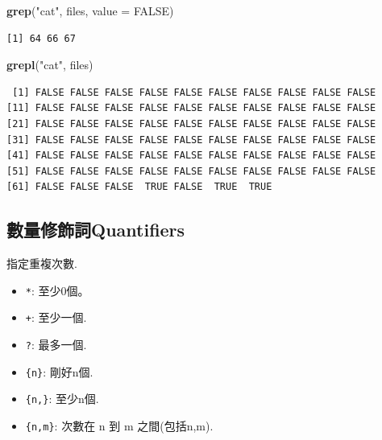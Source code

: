\documentclass[]{book}
\newenvironment{Shaded}{\begin{snugshade}}{\end{snugshade}}
\newcommand{\DataTypeTok}[1]{\textcolor[rgb]{0.13,0.29,0.53}{#1}}
\newcommand{\KeywordTok}[1]{\textcolor[rgb]{0.13,0.29,0.53}{\textbf{#1}}}
\newcommand{\NormalTok}[1]{#1}
\newcommand{\OtherTok}[1]{\textcolor[rgb]{0.56,0.35,0.01}{#1}}
\newcommand{\StringTok}[1]{\textcolor[rgb]{0.31,0.60,0.02}{#1}}
\providecommand{\tightlist}{%
  \setlength{\itemsep}{0pt}\setlength{\parskip}{0pt}}
\theoremstyle{definition}
\theoremstyle{definition}
\theoremstyle{definition}
\theoremstyle{remark}
\begin{document}
\begin{Shaded}
\begin{Highlighting}[]
\KeywordTok{grep}\NormalTok{(}\StringTok{"cat"}\NormalTok{, files, }\DataTypeTok{value =} \OtherTok{FALSE}\NormalTok{)}
\end{Highlighting}
\end{Shaded}

\begin{verbatim}
[1] 64 66 67
\end{verbatim}

\begin{Shaded}
\begin{Highlighting}[]
\KeywordTok{grepl}\NormalTok{(}\StringTok{"cat"}\NormalTok{, files)}
\end{Highlighting}
\end{Shaded}

\begin{verbatim}
 [1] FALSE FALSE FALSE FALSE FALSE FALSE FALSE FALSE FALSE FALSE
[11] FALSE FALSE FALSE FALSE FALSE FALSE FALSE FALSE FALSE FALSE
[21] FALSE FALSE FALSE FALSE FALSE FALSE FALSE FALSE FALSE FALSE
[31] FALSE FALSE FALSE FALSE FALSE FALSE FALSE FALSE FALSE FALSE
[41] FALSE FALSE FALSE FALSE FALSE FALSE FALSE FALSE FALSE FALSE
[51] FALSE FALSE FALSE FALSE FALSE FALSE FALSE FALSE FALSE FALSE
[61] FALSE FALSE FALSE  TRUE FALSE  TRUE  TRUE
\end{verbatim}

\hypertarget{quantifiers}{%
\subsection{數量修飾詞Quantifiers}\label{quantifiers}}

指定重複次數.

\begin{itemize}
\tightlist
\item
  \texttt{*}: 至少0個。\\
\item
  \texttt{+}: 至少一個.\\
\item
  \texttt{?}: 最多一個.\\
\item
  \texttt{\{n\}}: 剛好n個.\\
\item
  \texttt{\{n,\}}: 至少n個.\\
\item
  \texttt{\{n,m\}}: 次數在 n 到 m 之間(包括n,m).
\end{itemize}
\end{document}
